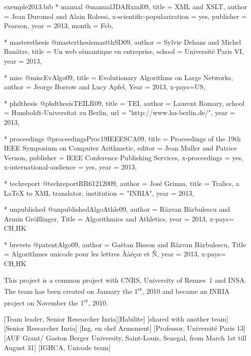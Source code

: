 \documentclass{ra2013}
\begin{document}
\begin{filecontents+}{exemple2013.bib}
    * manual
@manual{JDARxml09,
title = {XML and XSLT},
author = {Jean Duromol and Alain Rolessi}, 
x-scientific-popularization = {yes}, 
publisher = {Pearson}, 
year = 2013, 
month = {Feb}, 
}


    * mastersthesis
@masterthesis{mastthSD09,
author = {Sylvie Dehans and Michel Banâtre},
title = {Un web sémantique en entreprise}, 
school = {Université Paris VI}, 
year = 2013, 
}


    * misc
@misc{EvAlgo09,
title = {Evolutionary Algorithms on Large Networks}, 
author = {Jeorge Borrow and Lucy Apfel}, 
Year = 2013, 
x-pays={US},
}


    * phdthesis
@phdthesis{TEILR09,
title = {TEI},
author = {Laurent Romary},
school = {Humboldt-Universitat zu Berlin},
url =  "http://www.hu-berlin.de/",
year = 2013, 
}


    * proceedings
@proceedings{Proc19IEEESCA09,
title = {Proceedings of the 19th IEEE Symposium on Computer Arithmetic}, 
editor = {Jean Muller and Patrice Vernon}, 
publisher = {IEEE Conference Publishing Services}, 
x-proceedings = {yes}, 
x-international-audience = {yes}, 
year = 2013, 
}


    * techreport
@techreport{RR61212009,
author = {José Grimm},
title = {Tralics, a LaTeX to XML translator}, 
institution = "INRIA", 
year = 2013, 
}


    * unpublished
@unpublished{AlgoAthle09,
author = {R{\u{a}}zvan B{\u{a}}rbulescu and Armin Größlinger},
Title = {Algorithmics and Athletics},
year = 2013,
x-pays= {CH,HK}
}


   * brevets
@patent{Algo09,
author = {Gaëtan Bisson and Răzvan Bărbulescu},
Title = {Algorithmes unicode pour les lettres Ààéçœ et Ñ},
year = 2013,
x-pays= {CH,HK}
}


\end{filecontents+}

\maketitle


\begin{moreinfo}
  This project is a common project with CNRS, University of Rennes~1 and INSA. The
  team has been created on January the 1\textsuperscript{st}, 2010 and became an
  INRIA project on November the 1\textsuperscript{st}, 2010.
\end{moreinfo}

\begin{composition}

       [Team leader, Senior Researcher Inria][Habilite]
       [shared with another team]
       [Senior Researcher Inria]
       [Ing. en chef Armement]
       [Professor, Université Paris 13]
       [AUF Grant/ Gaston Berger University, Saint-Louis, Senegal, from March 1st till August 31]
       [IGHCA, Unicode team]
\end{composition}
\end{document}
